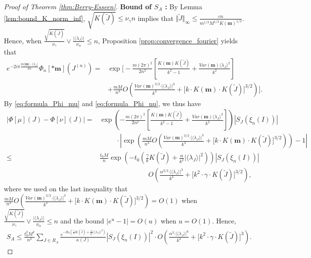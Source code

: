 \documentclass[10pt,11pt]{amsart}%
\begin{document}
\begin{proof}[Proof of Theorem \ref{thm:Berry-Esseen}]
\textbf{Bound of $S_{A}$ :}
By Lemma \ref{lem:bound_K_norm_inf}, $\sqrt{K(\tilde{J})}\leq \nu_{\gamma}n$ implies that $\Vert \tilde{J}\Vert_{\infty}\leq \frac{cn}{m^{1/3}M^{1/3}K(\mathbf{m})^{1/3}}$. Hence, when $\frac{\sqrt{K(\tilde{J})}}{\nu_{\gamma}}\vee\frac{\vert\langle \lambda_J\rangle\vert}{ \nu_{\alpha}}\leq n$, Proposition \ref{prop:convergence_fourier} yields that
\begin{align*}
e^{-2i \pi \frac{m\langle\mathbf{m}\rangle\cdot\langle \lambda_J\rangle}{kn}}\Phi_{n}[*\mathbf{m}](J^{(n)})
=&\exp\Bigg[-\frac{m(2\pi)^2}{2n^2}\left[\frac{K(\mathbf{m})K(\tilde{J})}{k^2-1}+\frac{Var(\mathbf{m})\langle \lambda_J\rangle^2}{k^2}\right]\\
&+\frac{mM}{n^3}O\left(\frac{Var(\mathbf{m})^{3/2}\cdot\vert\langle \lambda_J\rangle\vert^3}{k^3}+\Big[k \cdot K(\mathbf{m})\cdot K(\tilde{J})\Big]^{3/2}\right)\Bigg].
\end{align*}
By \eqref{eq:formula_Phi_mu} and \eqref{eq:formula_Phi_nu}, we thus have 
\begin{align*}
\left\vert \Phi[\mu](J)-\Phi[\nu](J)\right\vert=&\exp\left(-\frac{m(2\pi)^2}{2n^2}\left[\frac{K(\mathbf{m})K(\tilde{J})}{k^2-1}+\frac{Var(\mathbf{m})\langle \lambda_J\rangle^2}{k^2}\right]\right)\left\vert S_{J}(\xi_n(I))\right\vert\\
&\hspace{1cm}\cdot\left\vert \exp\left(\frac{mM}{n^3}O\left(\frac{Var(\mathbf{m})^{3/2}\cdot\vert\langle \lambda_J\rangle\vert^3}{k^3}+\Big[k \cdot K(\mathbf{m})\cdot K(\tilde{J})\Big]^{3/2}\right)\right)-1\right\vert\\
\leq& \frac{t_0M}{n}\exp\left(-t_0\left(\frac{\gamma}{k}K(\tilde{J})+\frac{\alpha}{k^2}\vert\langle\lambda_J\rangle\vert^2\right)\right)\left\vert S_{J}(\xi_n(I))\right\vert\\
&\hspace{3cm} O\left(\frac{\alpha^{3/2}\cdot\vert\langle \lambda_J\rangle\vert^3}{k^3}+\Big[k^2 \cdot \gamma\cdot K(\tilde{J})\Big]^{3/2}\right),
\end{align*}
where we used on the last inequality that $\frac{mM}{n^3}O\left(\frac{Var(\mathbf{m})^{3/2}\cdot\vert\langle \lambda_J\rangle\vert^3}{k^3}+\Big[k \cdot K(\mathbf{m})\cdot K(\tilde{J})\Big]^{3/2}\right)=O(1)$ when $\frac{\sqrt{K(\tilde{J})}}{\nu_{\gamma}}\vee\frac{\vert\langle \lambda_J\rangle\vert}{ \nu_{\alpha}}\leq n$ and the bound $\vert e^u-1\vert=O(u)$ when $u=O(1)$. Hence,
\begin{align*}
S_A\leq \frac{t_0^2M^2}{n^2}\sum_{J\in R_{A}}\frac{e^{-2t_0\left(\frac{\gamma}{k}K(\tilde{J})+\frac{\alpha}{k^2}\vert\langle\lambda_J\rangle\vert^2\right)}}{\kappa(J)}\left\vert S_{J}(\xi_n(I))\right\vert^2\cdot O\left(\frac{\alpha^{3}\cdot\vert\langle \lambda_J\rangle\vert^6}{k^3}+\Big[k^2 \cdot \gamma\cdot K(\tilde{J})\Big]^{3}\right).

\end{align*}
\end{proof}
\end{document}

